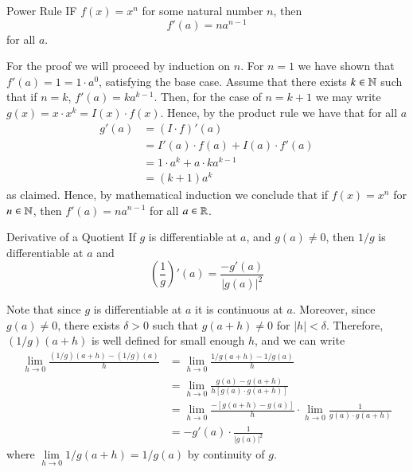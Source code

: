\documentclass[12pt]{report}
\begin{document}
\begin{thm}{Power Rule}{}
    IF $f(x) = x^n$ for some natural number $n$, then $$f'(a) = na^{n-1}$$ for all $a$.
\end{thm}
\begin{proof*}{}{}
    For the proof we will proceed by induction on $n$. For $n = 1$ we have shown that $f'(a) = 1 = 1\cdot a^0$, satisfying the base case. Assume that there exists $k \in \mathbb N$ such that if $n = k$, $f'(a) = ka^{k-1}$. Then, for the case of $n = k+1$ we may write $g(x) = x\cdot x^k = I(x)\cdot f(x)$. Hence, by the product rule we have that for all $a$ \begin{align*}
        g'(a) &= (I\cdot f)'(a) \\
        &= I'(a) \cdot f(a) + I(a) \cdot f'(a) \\
        &= 1\cdot a^k + a\cdot ka^{k-1} \\
        &= (k+1)a^k
    \end{align*}
    as claimed. Hence, by mathematical induction we conclude that if $f(x) = x^n$ for $n \in \mathbb N$, then $f'(a) = na^{n-1}$ for all $a \in \mathbb R$.
\end{proof*}


\begin{thm}{Derivative of a Quotient}{}
    If $g$ is differentiable at $a$, and $g(a) \neq 0$, then $1/g$ is differentiable at $a$ and $$\left(\frac{1}{g}\right)'(a) = \frac{-g'(a)}{|g(a)|^2}$$
\end{thm}
\begin{proof*}{}{}
    Note that since $g$ is differentiable at $a$ it is continuous at $a$. Moreover, since $g(a) \neq 0$, there exists $\delta > 0$ such that $g(a+h) \neq 0$ for $|h| < \delta$. Therefore, $(1/g)(a+h)$ is well defined for small enough $h$, and we can write \begin{align*}
        \lim\limits_{h\rightarrow 0}\frac{(1/g)(a+h) - (1/g)(a)}{h} &= \lim\limits_{h\rightarrow 0}\frac{1/g(a+h) - 1/g(a)}{h} \\
        &= \lim\limits_{h\rightarrow 0}\frac{g(a) - g(a+h)}{h[g(a)\cdot g(a+h)]} \\
        &= \lim\limits_{h\rightarrow 0}\frac{-[g(a+h)-g(a)]}{h}\cdot \lim\limits_{h\rightarrow 0}\frac{1}{g(a)\cdot g(a+h)} \\
        &= -g'(a)\cdot \frac{1}{|g(a)|^2}
    \end{align*}
    where $\lim\limits_{h\rightarrow 0}1/g(a+h) = 1/g(a)$ by continuity of $g$.
\end{proof*}
\end{document}

